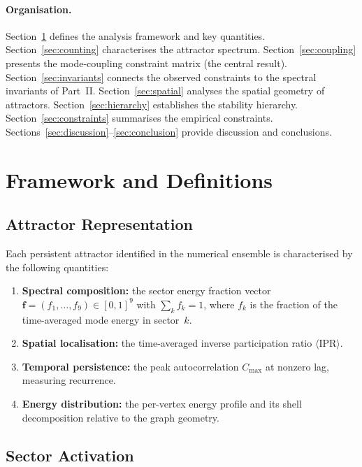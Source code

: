 \documentclass[12pt,a4paper]{article}
\begin{document}
\paragraph{Organisation.}
Section~\ref{sec:framework} defines the analysis framework and key
quantities.  Section~\ref{sec:counting} characterises the attractor
spectrum.  Section~\ref{sec:coupling} presents the mode-coupling
constraint matrix (the central result).  Section~\ref{sec:invariants}
connects the observed constraints to the spectral invariants of
Part~II.  Section~\ref{sec:spatial} analyses the spatial geometry of
attractors.  Section~\ref{sec:hierarchy} establishes the stability
hierarchy.  Section~\ref{sec:constraints} summarises the empirical
constraints.  Sections~\ref{sec:discussion}--\ref{sec:conclusion}
provide discussion and conclusions.


\section{Framework and Definitions}\label{sec:framework}

\subsection{Attractor Representation}

Each persistent attractor identified in the numerical ensemble is
characterised by the following quantities:

\begin{enumerate}[nosep]
\item \textbf{Spectral composition:} the sector energy fraction
  vector $\mathbf{f} = (f_1, \ldots, f_9) \in [0,1]^9$ with
  $\sum_k f_k = 1$, where $f_k$ is the fraction of the
  time-averaged mode energy in sector~$k$.
\item \textbf{Spatial localisation:} the time-averaged inverse
  participation ratio $\langle \mathrm{IPR} \rangle$.
\item \textbf{Temporal persistence:} the peak autocorrelation
  $C_{\max}$ at nonzero lag, measuring recurrence.
\item \textbf{Energy distribution:} the per-vertex energy profile
  and its shell decomposition relative to the graph geometry.
\end{enumerate}

\subsection{Sector Activation}
\end{document}
